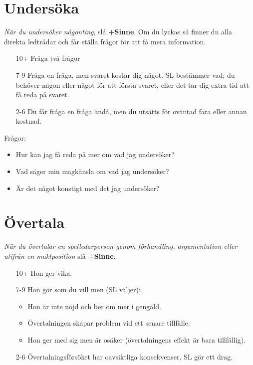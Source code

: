 \section{Undersöka}
\textit{När du undersöker någonting}, slå \textbf{+Sinne}. Om du lyckas så finner du alla direkta ledtrådar och får ställa frågor för att få mera information.
\begin{itemize}
  \item[10+] Fråga två frågor
  \item[7-9] Fråga en fråga, men svaret kostar dig något. SL bestämmer vad; du behöver någon eller något för att förstå svaret, eller det tar dig extra tid att få reda på svaret.
  \item[2-6] Du får fråga en fråga ändå, men du utsätts för oväntad fara eller annan kostnad.
\end{itemize}
Frågor:
\begin{itemize}
 \item Hur kan jag få reda på mer om vad jag undersöker?
 \item Vad säger min magkänsla om vad jag undersöker?
 \item Är det något konstigt med det jag undersöker?
\end{itemize}
\section{Övertala}
\textit{När du övertalar en spelledarperson genom förhandling, argumentation eller utifrån en maktposition} slå \textbf{+Sinne}.
\begin{itemize}
  \item[10+] Hon ger vika.
  \item[7-9] Hon gör som du vill men (SL väljer):
  \begin{itemize}
    \item Hon är inte nöjd och ber om mer i gengäld.
    \item Övertalningen skapar problem vid ett senare tillfälle.
    \item Hon ger med sig men är osäker (övertalningens effekt är bara tillfällig).
  \end{itemize}
  \item[2-6] Övertalningsförsöket har oavsiktliga konsekvenser. SL gör ett drag.
\end{itemize}

